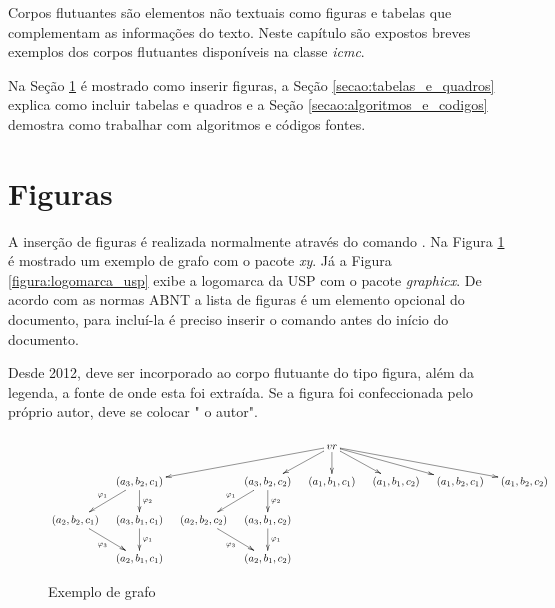 
Corpos flutuantes são elementos não textuais como figuras e tabelas que complementam as informações do texto. Neste capítulo são expostos breves exemplos dos corpos flutuantes disponíveis na classe \textit{icmc}.

Na Seção \ref{secao:figuras} é mostrado como inserir figuras, a Seção \ref{secao:tabelas_e_quadros} explica como incluir tabelas e quadros e a Seção \ref{secao:algoritmos_e_codigos} demostra como trabalhar com algoritmos e códigos fontes.

\section{Figuras}
\label{secao:figuras}

A inserção de figuras é realizada normalmente através do comando . Na Figura \ref{figura:exemplo_grafo} é mostrado um exemplo de grafo com o pacote \textit{xy}. Já a Figura \ref{figura:logomarca_usp} exibe a logomarca da USP com o pacote \textit{graphicx}. De acordo com as normas ABNT a lista de figuras é um elemento opcional do documento, para incluí-la é preciso inserir o comando  antes do início do documento.

Desde 2012, deve ser incorporado ao corpo flutuante do tipo figura, além da legenda, a fonte de onde esta foi extraída. Se a figura foi confeccionada pelo próprio autor, deve se colocar " o autor".

\begin{figure}[htb]
\caption{Exemplo de grafo}
\label{figura:exemplo_grafo}
\centering
\begin{scriptsize}
$$
\xymatrix@R20pt@C10pt{
 & & & & vr \ar[dlll] \ar[dl] \ar[d] \ar[dr] \ar[drr] \ar[drrr] & & & \\
 & (a_3, b_2, c_1) \ar[d]^{\varphi_2} \ar[dl]_{\varphi_1} & & (a_3, b_2, c_2) \ar[d]^{\varphi_2} \ar[dl]_{\varphi_1} & (a_1, b_1, c_1) & (a_1, b_1, c_2) & (a_1, b_2, c_1) & (a_1, b_2, c_2) \\
 (a_2, b_2, c_1) \ar[dr]_{\varphi_3} & (a_3, b_1, c_1) \ar[d]^{\varphi_1} & (a_2, b_2, c_2) \ar[dr]_{\varphi_3} & (a_3, b_1, c_2) \ar[d]^{\varphi_1} & & & & \\
& (a_2, b_1, c_1)  & & (a_2, b_1, c_2) & & & & \\
}
$$
\end{scriptsize}
\end{figure}


